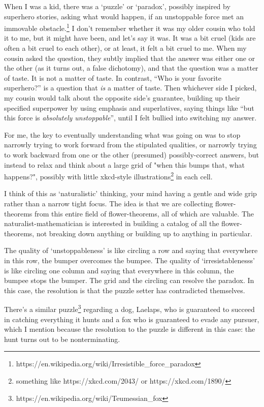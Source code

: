 \documentclass{proc-l}
\theoremstyle{definition}
\theoremstyle{remark}
\numberwithin{equation}{section}
\begin{document}
When I was a kid, there was a `puzzle' or `paradox', possibly inspired by superhero stories, asking what would happen, if an unstoppable force met an immovable obstacle.\footnote{https://en.wikipedia.org/wiki/Irresistible\_force\_paradox}
I don't remember whether it was my older cousin who told it to me, but it might have been, and let's say it was.
It was a bit cruel (kids are often a bit cruel to each other), or at least, it felt a bit cruel to me.
When my cousin asked the question,
they subtly implied that the answer was either one or the other (as it turns out, a false dichotomy),
and that the question was a matter of taste. It is not a matter of taste. In contrast, ``Who is your favorite superhero?'' is a question that \emph{is} a matter of taste.
Then whichever side I picked, my cousin would talk about the opposite side's guarantee,
building up their specified superpower by using emphasis and superlatives,
saying things like ``but this force is \emph{absolutely unstoppable}'',
until I felt bullied into switching my answer.

For me, the key to eventually understanding what was going on was to stop narrowly trying to work forward from the stipulated qualities, or narrowly trying to work backward from one or the other (presumed) possibly-correct answers, but instead to relax and think about a large grid of "when this bumps that, what happens?", possibly with little xkcd-style illustrations\footnote{something like https://xkcd.com/2043/ or https://xkcd.com/1890/} in each cell.


I think of this as `naturalistic' thinking, your mind having a gentle and wide grip rather than a narrow tight focus. The idea is that we are collecting flower-theorems from this entire field of flower-theorems, all of which are valuable. The naturalist-mathematician is interested in building a catalog of all the flower-theorems, not breaking down anything or building up to anything in particular.

The quality of `unstoppableness' is like circling a row and saying that everywhere in this row, the bumper overcomes the bumpee.
The quality of `irresistablenesss' is like circling one column and saying that everywhere in this column, the bumpee stops the bumper.
The grid and the circling can resolve the paradox.
In this case, the resolution is that the puzzle setter has contradicted themselves.

There's a similar puzzle\footnote{https://en.wikipedia.org/wiki/Teumessian\_fox} regarding a dog, Laelaps, who is guaranteed to succeed in catching everything it hunts and a fox who is guaranteed to evade any pursuer,
which I mention because the resolution to the puzzle is different in this case: the hunt turns out to be nonterminating.
\end{document}
